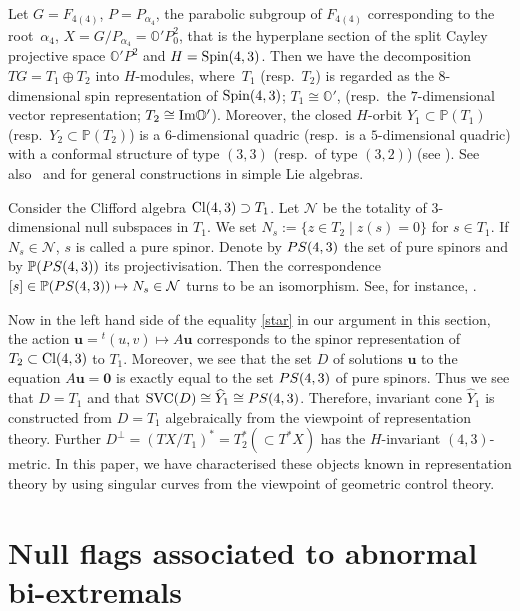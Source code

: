 \documentclass[11pt]{article}
\numberwithin{equation}{section}
\numberwithin{equation}{section}
\theoremstyle{definition}
\newcommand{\PP}{\mathbb{P}}
\newcommand{\uuu}{\boldsymbol{u}}
\newcommand{\0}{\boldsymbol{0}}
\newcommand{\OO}{{\mathbb O}}
\newcommand{\Spin}{{\mbox {\rm Spin}}}
\newcommand{\SVC}{{\mbox {\rm SVC}}}
\begin{document}
\begin{Remark}
\label{Remark-representation-theory}
Let $G = F_{4(4)}$, $P = P_{\alpha_4}$, the parabolic subgroup of $F_{4(4)}$
corresponding to the root~$\alpha_4$,
$X = G/P_{\alpha_4} = \OO' P^2_0$, that is
the hyperplane section of the split Cayley projective space $\OO' P^2$ and $H = \Spin(4, 3)$.
Then we have the decomposition $TG = T_1\oplus T_2$ into $H$-modules, where~$T_1$ (resp.\ $T_2$)
is regarded as the $8$-dimensional spin representation of $\Spin(4, 3)$; $T_1 \cong \OO'$,
(resp.\ the $7$-dimensional vector representation; $T_2 \cong {\mbox{\rm {Im}}}\OO'$).
Moreover, the closed $H$-orbit $Y_1 \subset \PP(T_1)$ (resp.\ $Y_2 \subset \PP(T_2)$)
is a $6$-dimensional quadric (resp.\ is a $5$-dimensional quadric)
with a conformal structure of type $(3, 3)$ (resp.\ of type $(3, 2)$) (see \cite[Section~6.3]{LM}). See
also~\cite[Section~2]{LM} and \cite{BE, IL} for general constructions in simple Lie algebras.

Consider the Clifford algebra ${\mbox{\rm{Cl}}}(4,3) \supset T_1$.
Let ${\mathcal N}$ be the totality of $3$-dimensional null subspaces in $T_1$.
We set $N_s := \{ z \in T_2 \mid z(s) = 0\}$ for $s \in T_1$.
If $N_s \in {\mathcal N}$, $s$ is called a pure spinor. Denote by ${\rm PS}(4, 3)$
the set of pure spinors and by $\PP({\rm PS}(4, 3))$ its projectivisation. Then the correspondence $[s] \in \PP({\rm PS}(4, 3)) \mapsto N_s \in {\mathcal N}$ turns to be an isomorphism. See, for instance, \cite[p.~241 and~p.~283]{Harvey}.

Now in the left hand side of the equality \eqref{star} in our argument in this section,
the action $\uuu = {}^t(u, v) \mapsto A\uuu$
corresponds to the spinor representation of $T_2 \subset {\mbox{\rm Cl}}(4, 3)$ to $T_1$.
Moreover, we see that the set $D$ of solutions
$\uuu$ to the equation $A\uuu = \0$
is exactly equal to the set ${\rm PS}(4, 3)$ of pure spinors.
Thus we see that $D = T_1$ and that {$\SVC(D) \cong \widehat{Y}_1 \cong {\rm PS}(4,3)$}.
Therefore, invariant cone $\widehat{Y}_1$ is constructed from $D = T_1$ algebraically from the viewpoint of
representation theory. Further
$D^\perp = (TX/T_1)^* = T_2^* (\subset T^*X)$ has the $H$-invariant $(4, 3)$-metric.
In this paper, we have characterised these objects known in representation theory by using singular curves
from the viewpoint of geometric control theory.
\end{Remark}

\section{Null flags associated to abnormal bi-extremals}
\label{Null-flags}
\end{document}
